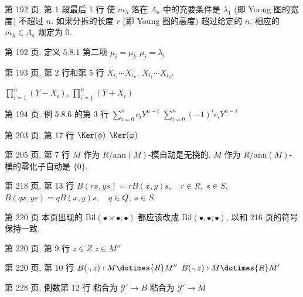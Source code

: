 \documentclass{AJerrata}
\begin{document}
\begin{Errata}
		\item[第 192 页, 第 1 段最后 1 行]
		\Orig 使 $m_\lambda$ 落在 $\Lambda_n$ 中的充要条件是 $\lambda_1$ (即 Young 图的宽度) 不超过 $n$.
		\Corr 如果分拆的长度 $r$ (即 Young 图的高度) 超过给定的 $n$, 相应的 $m_\lambda \in \Lambda_n$ 规定为 $0$.
		
		\item[第 192 页, 定义 5.8.1 第二项]
		\Orig $\mu_i = \mu_k$
		\Corr $\mu_i = \lambda_i$
		
		\item[第 193 页, 第 2 行和第 5 行]
		\Orig $X_{i_1} \cdots X_{i_n}$.
		\Corr $X_{i_1} \cdots X_{i_k}$.
		
		\Orig $\prod_{i=1}^n (Y - X_i)$,
		\Corr $\prod_{i=1}^n (Y + X_i)$
				
		\item[第 194 页, 例 5.8.6 的第 3 行]
		\Orig $\sum_{i=0}^n c_i Y^{n-i}$
		\Corr $\sum_{i=0}^n (-1)^i c_i Y^{n-i}$
		
		\item[第 203 页, 第 17 行]
		\Orig $\Ker(\phi)$
		\Corr $\Ker(\varphi)$

   		\item[第 205 页, 第 7 行]
		\Orig $M$ 作为 $R/\mathrm{ann}(M)$-模自动是无挠的.
		\Corr $M$ 作为 $R/\mathrm{ann}(M)$-模的零化子自动是 $\{0\}$.

        \item[第 218 页, 第 13 行]
        \Orig $B(rx, ys) = rB(x,y)s, \quad r \in R, \; s \in S$.
        \newline
        \Corr $B(qx, ys) = qB(x,y)s, \quad q \in Q, \; s \in S$.

        \item[第 220 页]
        本页出现的 $\mathrm{Bil}(\bullet \times \bullet; \bullet)$ 都应该改成 $\mathrm{Bil}(\bullet, \bullet; \bullet)$, 以和 216 页的符号保持一致.
        
        \item[第 220 页, 第 9 行]
        \Orig $z \in Z$
        \Corr $z \in M''$
        
        \item[第 220 页, 第 10 行]
        \Orig $B(\cdot, z): M \dotimes{R} M''$
        \Corr $B(\cdot, z): M \dotimes{R} M'$
        
        \item[第 228 页, 倒数第 12 行]
        \Orig 粘合为 $\mathcal{Y}' \to B$
        \Corr 粘合为 $\mathcal{Y}' \to M$
       

\end{Errata}
\end{document}
